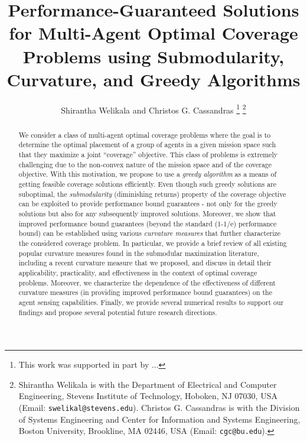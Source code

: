 \documentclass[letterpaper, 10 pt, conference]{ieeeconf}
\title{\LARGE \bf
Performance-Guaranteed Solutions for Multi-Agent Optimal Coverage Problems using Submodularity, Curvature, and Greedy Algorithms 
}
\author{Shirantha Welikala and Christos G. Cassandras %
\thanks{This work was supported in part by ... }
\thanks{Shirantha Welikala is with the Department of Electrical and Computer Engineering, Stevens Institute of Technology, Hoboken, NJ 07030, USA (Email: \texttt{{\small swelikal@stevens.edu}}). Christos G. Cassandras is with the Division of Systems Engineering and Center for Information and Systems Engineering, Boston University, Brookline, MA 02446, USA (Email: \texttt{{\small cgc@bu.edu}}).}}
\begin{document}
\maketitle

\thispagestyle{plain}
\pagestyle{plain}



\begin{abstract}
We consider a class of multi-agent optimal coverage problems where the goal is to determine the optimal placement of a group of agents in a given mission space such that they maximize a joint ``coverage'' objective. This class of problems is extremely challenging due to the non-convex nature of the mission space and of the coverage objective. With this motivation, we propose to use a \emph{greedy algorithm} as a means of getting feasible coverage solutions efficiently. Even though such greedy solutions are suboptimal, the \emph{submodularity} (diminishing returns) property of the coverage objective can be exploited to provide performance bound guarantees - not only for the greedy solutions but also for any subsequently improved solutions. Moreover, we show that improved performance bound guarantees (beyond the standard (1-1/e) performance bound) can be established using various \emph{curvature measures} that further characterize the considered coverage problem. In particular, we provide a brief review of all existing popular curvature measures found in the submodular maximization literature, including a recent curvature measure that we proposed, and discuss in detail their applicability, practicality, and effectiveness in the context of optimal coverage problems. Moreover, we characterize the dependence of the effectiveness of different curvature measures (in providing improved performance bound guarantees) on the agent sensing capabilities. Finally, we provide several numerical results to support our findings and propose several potential future research directions. 





\end{abstract}
\end{document}

